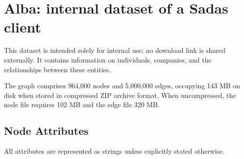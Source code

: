 \section{Alba: internal dataset of a Sadas client}
This dataset is intended solely for internal use; no download link is shared externally. It contains information on individuals, companies, and the relationships between these entities.

The graph comprises 964,000 nodes and 5,000,000 edges, occupying 143 MB on disk when stored in compressed ZIP archive format. When uncompressed, the node file requires 102 MB and the edge file 320 MB.

\subsection*{Node Attributes}
All attributes are represented as strings unless explicitly stated otherwise.
